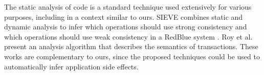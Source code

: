 The static analysis of code is a standard technique used extensively for 
various purposes, 
including in a context similar to ours.
SIEVE \cite{Li14Automating} combines static and dynamic analysis to infer
which operations should use strong consistency and which operations should
use weak consistency in a RedBlue system \cite{Li2012RedBlue}.
Roy et al. \cite{Roy14Writes} present an analysis algorithm that
describes the semantics of transactions.
These works are complementary to ours, since the proposed techniques
could be used to automatically infer application side effects.


